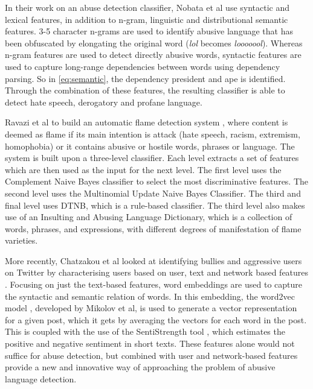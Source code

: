 In their work on an abuse detection classifier, Nobata et al \cite{nobata2016abusive} use syntactic and lexical features, in addition to n-gram, linguistic and distributional semantic features. 3-5 character n-grams are used to identify abusive language that has been obfuscated by elongating the original word (\textsl{lol} becomes \textsl{looooool}). Whereas n-gram features are used to detect directly abusive words, syntactic features are used to capture long-range dependencies between words using dependency parsing. So in \ref{eq:semantic}, the dependency president and ape is identified. Through the combination of these features, the resulting classifier is able to detect hate speech, derogatory and profane language.

Ravazi et al to build an automatic flame detection system \cite{razavi2010offensive}, where content is deemed as flame if its main intention is attack (hate speech, racism, extremism, homophobia) or it contains abusive or hostile words, phrases or language. The system is built upon a three-level classifier. Each level extracts a set of features which are then used as the input for the next level. The first level uses the Complement Naive Bayes classifier to select the most discriminative features. The second level uses the Multinomial Update Naive Bayes Classifier. The third and final level uses DTNB, which is a rule-based classifier. The third level also makes use of an Insulting and Abusing Language Dictionary, which is a collection of words, phrases, and expressions, with different degrees of manifestation of flame varieties.

More recently, Chatzakou et al looked at identifying bullies and aggressive users on Twitter by characterising users based on user, text and network based features \cite{chatzakou2017mean}. Focusing on just the text-based features, word embeddings are used to capture the syntactic and semantic relation of words. In this embedding, the word2vec model \cite{mikolov2013efficient}, developed by Mikolov et al, is used to generate a vector representation for a given post, which it gets by averaging the vectors for each word in the post. This is coupled with the use of the SentiStrength tool \cite{SentiStrength:Home}, which estimates the positive and negative sentiment in short texts. These features alone would not suffice for abuse detection, but combined with user and network-based features provide a new and innovative way of approaching the problem of abusive language detection.

